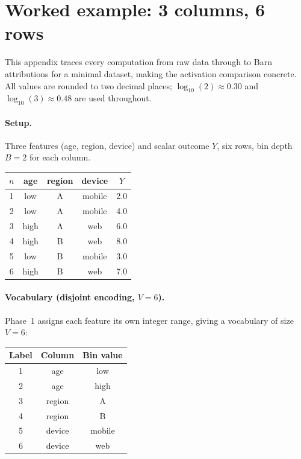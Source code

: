 \documentclass[11pt]{article}
\begin{document}
\appendix

\section{Worked example: 3 columns, 6 rows}
\label{app:worked-example}

This appendix traces every computation from raw data through to Barn attributions for a minimal dataset, making the activation comparison concrete.
All values are rounded to two decimal places; $\log_{10}(2) \approx 0.30$ and $\log_{10}(3) \approx 0.48$ are used throughout.

\paragraph{Setup.}
Three features (age, region, device) and scalar outcome $Y$, six rows, bin depth $B = 2$ for each column.

\medskip
\begin{center}
\begin{tabular}{ccccc}
\hline
$n$ & age & region & device & $Y$ \\
\hline
1 & low  & A & mobile & 2.0 \\
2 & low  & A & mobile & 4.0 \\
3 & high & A & web    & 6.0 \\
4 & high & B & web    & 8.0 \\
5 & low  & B & mobile & 3.0 \\
6 & high & B & web    & 7.0 \\
\hline
\end{tabular}
\end{center}

\paragraph{Vocabulary (disjoint encoding, $V = 6$).}
Phase~1 assigns each feature its own integer range, giving a vocabulary of size $V = 6$:

\medskip
\begin{center}
\begin{tabular}{ccc}
\hline
Label & Column & Bin value \\
\hline
1 & age    & low    \\
2 & age    & high   \\
3 & region & A      \\
4 & region & B      \\
5 & device & mobile \\
6 & device & web    \\
\hline
\end{tabular}
\end{center}
\end{document}
